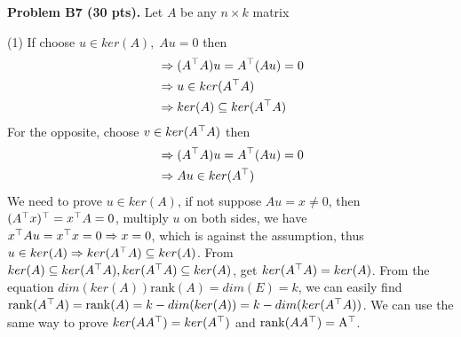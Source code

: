 \documentclass[12pt]{article}
\begin{document}
\vspace {0.25cm}\noindent
{\bf Problem B7 (30 pts).} 
Let $A$ be any $n\times k$ matrix

\medskip
(1) If choose $u \in ker(A), \;  Au = 0$ then
 \begin{align*}
 &\Rightarrow (A^{\top} A) u =  A^{\top} (A u) = 0 \\
 &\Rightarrow u  \in ker(A^{\top} A) \\
 &\Rightarrow ker(A) \subseteq ker(A^{\top} A)
 \end{align*}
 For the opposite, choose $v \in ker(A^{\top} A)$ then 
 \begin{align*}
 &\Rightarrow (A^{\top} A) u = A^{\top} (A u) = 0 \\
 &\Rightarrow A u \in ker(A^{\top}) 
 \end{align*}
 We need to prove $u \in ker(A)$, if not suppose $A u = x \neq 0$, then $( A^{\top} x) ^{\top} = x^{\top} A = 0$, multiply $u$ on both sides, we have $x^{\top} A u = x^{\top} x = 0 \Rightarrow x = 0$, which is against the assumption, thus $u \in ker(A) \Rightarrow ker(A^{\top} A) \subseteq ker(A)$. From $ker(A) \subseteq ker(A^{\top} A), ker(A^{\top} A) \subseteq ker(A)$, get $ker(A^{\top} A) = ker(A)$.
 From the equation $ dim(ker(A))  \mathrm{rank}(A) = dim(E) = k$, we can easily find $\mathrm{rank} (A^{\top} A) = \mathrm{rank}(A) = k - dim(ker(A)) = k - dim(ker(A^{\top}A))$. We can use the same way to prove $ker(AA^{\top}) = ker(A^{\top})$ and $\mathrm{rank}(AA^{\top}) = \mathrm{A^{\top}}$. 
\end{document}
